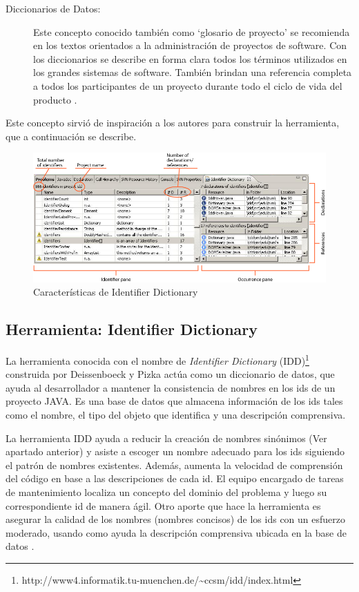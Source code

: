 \begin{description}
\item[Diccionarios de Datos:] Este concepto conocido también como `glosario de proyecto' se recomienda en los textos orientados a la administración de proyectos de software. Con los diccionarios se describe en forma clara todos los términos utilizados en los grandes sistemas de software. También brindan una referencia completa a todos los participantes de un proyecto durante todo el ciclo de vida del producto \cite{RSPMGH02}.
\end{description}

Este concepto sirvió de inspiración a los autores para construir la herramienta, que a continuación se describe.

\begin{figure}[t!] %
\centerline{%
\includegraphics[scale= 0.55]{./cap3/idd_2.png}
}
\caption{Características de Identifier Dictionary}
\label{captura3}
\end{figure}

\pagebreak
\subsection{Herramienta: Identifier Dictionary}
\label{sec:algIdDic}
La herramienta conocida con el nombre de \textit{Identifier Dictionary} (IDD)\footnote[1]{http://www4.informatik.tu-muenchen.de/\~{}ccsm/idd/index.html} construida por Deissenboeck y Pizka \cite{DFPM05} actúa como un diccionario de datos, que ayuda al desarrollador a mantener la consistencia de nombres en los ids de un proyecto JAVA. Es una base de datos que almacena información de los ids tales como el nombre, el tipo del objeto que identifica y una descripción comprensiva.

La herramienta IDD ayuda a reducir la creación de nombres sinónimos (Ver apartado anterior) y asiste a escoger un nombre adecuado para los ids siguiendo el patrón de nombres existentes. Además, aumenta la velocidad de comprensión del código en base a las descripciones de cada id. El equipo encargado de tareas de mantenimiento localiza un concepto del dominio del problema y luego su correspondiente id de manera ágil. Otro aporte que hace la herramienta es asegurar la calidad de los nombres (nombres concisos) de los ids con un esfuerzo moderado, usando como ayuda la descripción comprensiva ubicada en la base de datos \cite{DFPM05,LFBEX07}.

